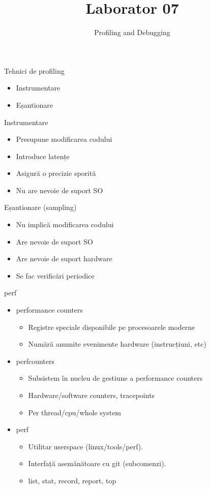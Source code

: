 \documentclass{so.cs.pub.ro}
\title[Laborator 07]{Laborator 07}
\subtitle{Profiling and Debugging}
\begin{document}
\frame{\titlepage}


\begin{frame}{Tehnici de profiling}
  \begin{itemize}
    \item Instrumentare
    \item Eșantionare
  \end{itemize}
\end{frame}

\begin{frame}{Instrumentare}
  \begin{itemize}
    \item Presupune modificarea codului
    \item Introduce latențe
    \item Asigură o precizie sporită
    \item Nu are nevoie de suport SO
  \end{itemize}
\end{frame}

\begin{frame}{Eșantionare (sampling)}
  \begin {itemize}
    \item Nu implică modificarea codului
    \item Are nevoie de suport SO
    \item Are nevoie de suport hardware
    \item Se fac verificări periodice
  \end {itemize}
\end{frame}

\begin{frame}{perf}
  \begin{itemize}
    \item performance counters
	\begin{itemize}
	\item Registre speciale disponibile pe procesoarele moderne
	\item Numără anumite evenimente hardware (instrucțiuni, etc)
	\end{itemize}
    \item perfcounters
    \begin{itemize}
    \item Subsistem în nucleu de gestiune a performance counters
    \item Hardware/software counters, tracepoints
    \item Per thread/cpu/whole system
    \end{itemize}
    \item perf
     \begin{itemize}
    \item Utilitar userspace (linux/tools/perf).
    \item Interfață asemănătoare cu git (subcomenzi).
    \item list, stat, record, report, top
     \end{itemize}
  \end{itemize}
\end{frame}
\end{document}
